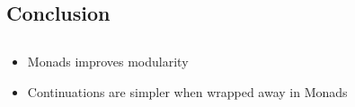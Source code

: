 \documentclass{beamer}
\begin{document}

\begin{frame}[fragile]
\section{Conclusion}
\subsection{}
\begin{itemize}
\item Monads improves modularity
\item Continuations are simpler when wrapped away in Monads
\end{itemize}
\end{frame}
\end{document}
